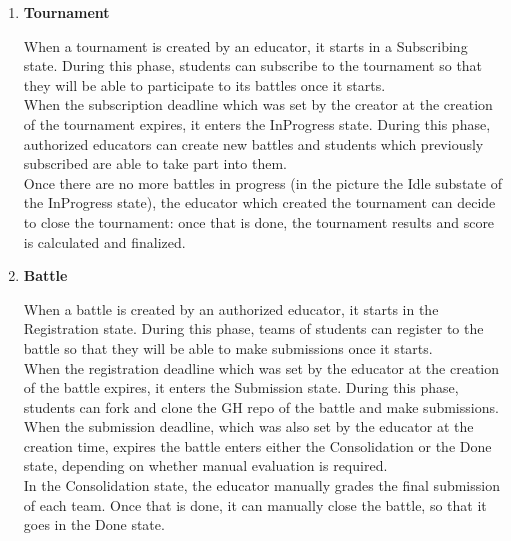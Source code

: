 \begin{enumerate}[label=\textbf{SD\arabic*}:,ref=SD\arabic*,leftmargin=1.3cm]
	\item \textbf{Tournament}
	      \begin{adjustbox}{
			      max size={\textwidth}{},
			      center,
			      caption={Tournament state diagram},
			      label={fig:Tournament state diagram},
			      figure=H}
	      \end{adjustbox}

	      When a tournament is created by an educator, it starts in a Subscribing state.
	      During this phase, students can subscribe to the tournament so that they will
	      be able to participate to its battles once it starts.\\
	      When the subscription deadline which was set by the creator at the creation of
	      the tournament expires, it enters the InProgress state. During this phase,
	      authorized educators can create new battles and students which previously
	      subscribed are able to take part into them. \\
	      Once there are no more battles in progress (in the picture the Idle substate
	      of the InProgress state), the educator which created the tournament can decide
	      to close the tournament: once that is done, the tournament results and score
	      is calculated and finalized.
	      \pagebreak

	\item \textbf{Battle}
	      \begin{adjustbox}{
			      max size={\textwidth}{\textheightwithcaption{1}},
			      center,
			      caption={Battle state diagram},
			      label={fig:Battle state diagram},
			      figure=H}
		      \puml{puml/battle-state}
	      \end{adjustbox}

	      When a battle is created by an authorized educator, it starts in the Registration state.
	      During this phase, teams of students can register to the battle so that they will
	      be able to make submissions once it starts.\\
	      When the registration deadline which was set by the educator at the creation of
	      the battle expires, it enters the Submission state. During this phase,
	      students can fork and clone the GH repo of the battle and make submissions. \\
	      When the submission deadline, which was also set by the educator at the creation time,
	      expires the battle enters either the Consolidation or the Done state, depending on
	      whether manual evaluation is required. \\
	      In the Consolidation state, the educator manually grades the final submission of each
	      team. Once that is done, it can manually close the battle, so that it goes in the
	      Done state.
\end{enumerate}
\pagebreak


